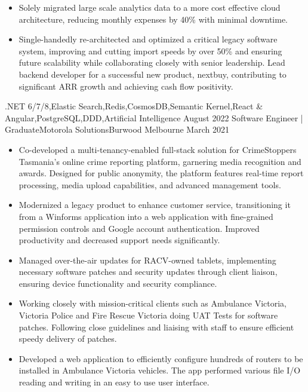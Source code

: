 \begin{experiences}
{\begin{itemize}
                        \item Solely migrated large scale analytics data to a more cost effective cloud architecture, reducing monthly expenses by 40\% with minimal downtime.
                        \item Single-handedly re-architected and optimized a critical legacy software system, improving and cutting import speeds by over 50\% and ensuring future scalability while collaborating closely with senior leadership. Lead backend developer for a successful new product, nextbuy, contributing to significant ARR growth and achieving cash flow positivity.                                                                   
                      \end{itemize}
                    }
                    {.NET 6/7/8,Elastic Search,Redis,CosmosDB,Semantic Kernel,React \& Angular,PostgreSQL,DDD,Artificial Intelligence}
  \emptySeparator
  \experience
    {August 2022} {Software Engineer | Graduate}{Motorola Solutions}{Burwood Melbourne}
    {March 2021}    {
                      \begin{itemize}
                        \item Co-developed a multi-tenancy-enabled full-stack solution for CrimeStoppers Tasmania's online crime reporting platform, garnering media recognition and awards. Designed for public anonymity, the platform features real-time report processing, media upload capabilities, and advanced management tools.
                        \item Modernized a legacy product to enhance customer service, transitioning it from a Winforms application into a web application with fine-grained permission controls and Google account authentication. Improved productivity and decreased support needs significantly.
                        \item Managed over-the-air updates for RACV-owned tablets, implementing necessary software patches and security updates through client liaison, ensuring device functionality and security compliance.
                        \item Working closely with mission-critical clients such as Ambulance Victoria, Victoria Police and Fire Rescue Victoria doing UAT Tests for software patches. Following close guidelines and liaising with staff to ensure efficient speedy delivery of patches.
                        \item Developed a web application to efficiently configure hundreds of routers to be installed in Ambulance Victoria vehicles. The app performed various file I/O reading and writing in an easy to use user interface.

\end{itemize}}
\end{experiences}
